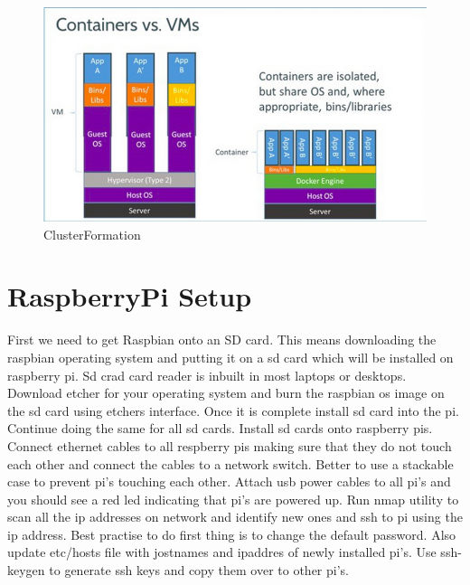 \begin{figure}[!ht]
	\centering\includegraphics[width=\columnwidth]{images/dockervsvm.png}
	 \caption{ClusterFormation}\label{f:clustering}
\end{figure}

\section{RaspberryPi Setup}
First we need to get Raspbian onto an SD card. This means downloading
the raspbian operating system and putting it on a sd card which will be
installed on raspberry pi. Sd crad card reader is inbuilt in most
laptops or desktops. Download etcher for your operating system and
burn the raspbian os image on the sd card using etchers
interface. Once it is complete install sd card into the pi. Continue
doing the same for all sd cards. Install sd cards onto raspberry
pis. Connect ethernet cables to all respberry pis making sure that
they do not touch each other and connect the cables to a network
switch. Better to use a stackable case to prevent pi's touching each other. 
Attach usb power cables to all pi's and you should see a red led
indicating that pi's are powered up. Run nmap utility to scan all the
ip addresses on network and identify new ones and ssh to pi using the
ip address. Best practise to do first thing is to change the default
password. Also update etc/hosts file with jostnames and ipaddres of
newly installed pi's. Use ssh-keygen to generate ssh keys and copy
them over to other pi's.
